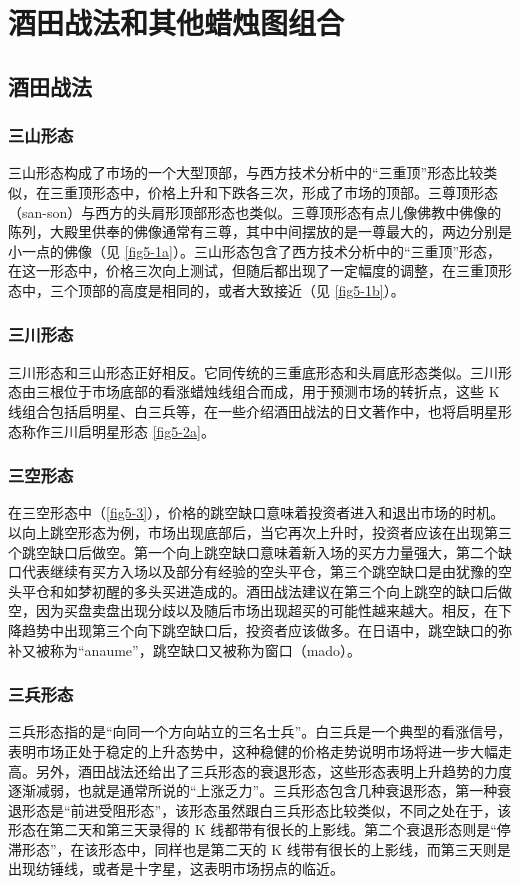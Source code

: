 \chapter{酒田战法和其他蜡烛图组合}
\section{酒田战法}
\subsection{三山形态}
三山形态构成了市场的一个大型顶部，与西方技术分析中的“三重顶”形态比较类似，在三重顶形态中，价格上升和下跌各三次，形成了市场的顶部。三尊顶形态（san-son）与西方的头肩形顶部形态也类似。三尊顶形态有点儿像佛教中佛像的陈列，大殿里供奉的佛像通常有三尊，其中中间摆放的是一尊最大的，两边分别是小一点的佛像（见 \autoref{fig5-1a}）。三山形态包含了西方技术分析中的“三重顶”形态，在这一形态中，价格三次向上测试，但随后都出现了一定幅度的调整，在三重顶形态中，三个顶部的高度是相同的，或者大致接近（见 \autoref{fig5-1b}）。

\subsection{三川形态}
三川形态和三山形态正好相反。它同传统的三重底形态和头肩底形态类似。三川形态由三根位于市场底部的看涨蜡烛线组合而成，用于预测市场的转折点，这些 K 线组合包括启明星、白三兵等，在一些介绍酒田战法的日文著作中，也将启明星形态称作三川启明星形态 \autoref{fig5-2a}。

\subsection{三空形态}
在三空形态中（\autoref{fig5-3}），价格的跳空缺口意味着投资者进入和退出市场的时机。以向上跳空形态为例，市场出现底部后，当它再次上升时，投资者应该在出现第三个跳空缺口后做空。第一个向上跳空缺口意味着新入场的买方力量强大，第二个缺口代表继续有买方入场以及部分有经验的空头平仓，第三个跳空缺口是由犹豫的空头平仓和如梦初醒的多头买进造成的。酒田战法建议在第三个向上跳空的缺口后做空，因为买盘卖盘出现分歧以及随后市场出现超买的可能性越来越大。相反，在下降趋势中出现第三个向下跳空缺口后，投资者应该做多。在日语中，跳空缺口的弥补又被称为“anaume”，跳空缺口又被称为窗口（mado）。

\subsection{三兵形态}
三兵形态指的是“向同一个方向站立的三名士兵”。白三兵是一个典型的看涨信号，表明市场正处于稳定的上升态势中，这种稳健的价格走势说明市场将进一步大幅走高。另外，酒田战法还给出了三兵形态的衰退形态，这些形态表明上升趋势的力度逐渐减弱，也就是通常所说的“上涨乏力”。三兵形态包含几种衰退形态，第一种衰退形态是“前进受阻形态”，该形态虽然跟白三兵形态比较类似，不同之处在于，该形态在第二天和第三天录得的 K 线都带有很长的上影线。第二个衰退形态则是“停滞形态”，在该形态中，同样也是第二天的 K 线带有很长的上影线，而第三天则是出现纺锤线，或者是十字星，这表明市场拐点的临近。

